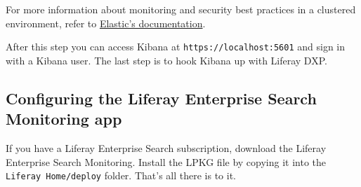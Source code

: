 For more information about monitoring and security best practices in a
clustered environment, refer to
\href{https://www.elastic.co/guide/en/elasticsearch/reference/6.5/es-monitoring.html}{Elastic's
documentation}.

After this step you can access Kibana at \texttt{https://localhost:5601}
and sign in with a Kibana user. The last step is to hook Kibana up with
Liferay DXP.

\subsection{Configuring the Liferay Enterprise Search Monitoring
app}\label{configuring-the-liferay-enterprise-search-monitoring-app}

If you have a Liferay Enterprise Search subscription, download the
Liferay Enterprise Search Monitoring. Install the LPKG file by copying
it into the \texttt{Liferay\ Home/deploy} folder. That's all there is to
it.

